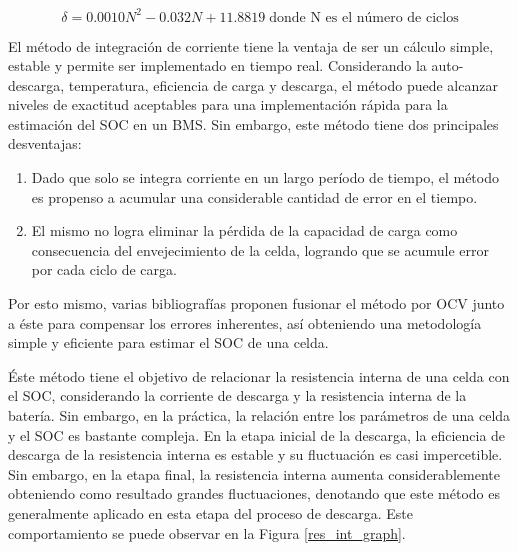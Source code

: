 \documentclass[10pt,a4paper]{article}
\newcounter{subsubsubsection}[subsubsection]
\begin{document}
\begin{equation}
    \delta = 0.0010N^2 - 0.032N + 11.8819\label{batt_cap_correction}\;
    \text{donde N es el n\'umero de ciclos}
\end{equation}

\noindent El m\'etodo de integraci\'on de corriente tiene la ventaja de ser un
c\'alculo simple, estable y permite ser implementado en tiempo real.
Considerando la auto-descarga, temperatura, eficiencia de carga y descarga, el
m\'etodo puede alcanzar niveles de exactitud aceptables para una
implementaci\'on r\'apida para la estimaci\'on del \acrshort{SOC} en un BMS. Sin
embargo, este m\'etodo tiene dos principales desventajas:

\begin{enumerate}
    \item Dado que solo se integra corriente en un largo per\'iodo de tiempo, el
        m\'etodo es propenso a acumular una considerable cantidad de error en el
        tiempo.
    \item El mismo no logra eliminar la p\'erdida de la capacidad de carga como
        consecuencia del envejecimiento de la celda, logrando que se acumule
        error por cada ciclo de carga.
\end{enumerate}

\noindent Por esto mismo, varias bibliograf\'ias proponen fusionar el m\'etodo
por \acrshort{OCV} junto a \'este para compensar los errores inherentes, as\'i
obteniendo una metodolog\'ia simple y eficiente para estimar el \acrshort{SOC}
de una celda.

\label{internalRMethod}

\noindent \'Este m\'etodo tiene el objetivo de relacionar la resistencia interna
de una celda con el \acrshort{SOC}, considerando la corriente de descarga y la
resistencia interna de la bater\'ia. Sin embargo, en la pr\'actica, la
relaci\'on entre los par\'ametros de una celda y el \acrshort{SOC} es bastante
compleja. En la etapa inicial de la descarga, la eficiencia de descarga de la
resistencia interna es estable y su fluctuaci\'on es casi impercetible. Sin
embargo, en la etapa final, la resistencia interna aumenta considerablemente
obteniendo como resultado grandes fluctuaciones, denotando que este m\'etodo es
generalmente aplicado en esta etapa del proceso de descarga. Este comportamiento
se puede observar en la Figura \ref{res_int_graph}.
\end{document}
